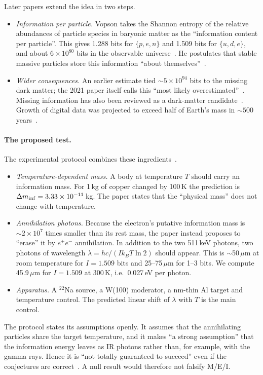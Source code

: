 Later papers extend the idea in two steps.
\begin{itemize}
\item \emph{Information per particle.} Vopson takes the Shannon entropy of the relative
  abundances of particle species in baryonic matter as the ``information content per particle''.
  This gives 1.288 bits for $\{p,e,n\}$ and 1.509 bits for $\{u,d,e\}$, and about $6\times10^{80}$
  bits in the observable universe~\cite{Vopson2021estimation}. He postulates that stable massive
  particles store this information ``about themselves''~\cite{Vopson2021estimation}.
\item \emph{Wider consequences.} An earlier estimate tied $\sim\!5\times10^{94}$ bits to the missing dark
  matter; the 2021 paper itself calls this ``most likely overestimated''~\cite{Vopson2021estimation}. Missing information has also been reviewed as a dark-matter candidate~\cite{Dzaferovic2021missing}.
  Growth of digital data was projected to exceed half of Earth's mass in $\sim500$
  years~\cite{Vopson2020information}.
\end{itemize}

\paragraph{The proposed test.}
The experimental protocol combines these ingredients~\cite{Vopson2022experimental}.
\begin{itemize}
\item \emph{Temperature-dependent mass.} A body at temperature $T$ should carry an information
  mass. For 1\,kg of copper changed by 100\,K the prediction is
  $\Delta m_{\rm inf}=3.33\times10^{-11}$\,kg. The paper states that the ``physical mass'' does
  not change with temperature.
\item \emph{Annihilation photons.} Because the electron's putative information mass is
  $\sim\!2\times10^{7}$ times smaller than its rest mass, the paper instead proposes to ``erase''
  it by $e^+e^-$ annihilation. In addition to the two 511\,keV photons, two photons of wavelength
  $\lambda=hc/(Ik_BT\ln2)$ should appear. This is $\sim$50\,$\mu$m at room temperature for
  $I=1.509$ bits and 25--75\,$\mu$m for 1--3 bits. We compute 45.9\,$\mu$m for $I=1.509$ at
  300\,K, i.e.\ 0.027\,eV per photon.
\item \emph{Apparatus.} A $^{22}$Na source, a W(100) moderator, a nm-thin Al target and
  temperature control. The predicted linear shift of $\lambda$ with $T$ is the main control.
\end{itemize}
The protocol states its assumptions openly. It assumes that the annihilating particles share the
target temperature, and it makes ``a strong assumption'' that the information energy leaves as IR
photons rather than, for example, with the gamma rays. Hence it is ``not totally guaranteed to
succeed'' even if the conjectures are correct~\cite{Vopson2022experimental}. A null result would
therefore not falsify M/E/I.

